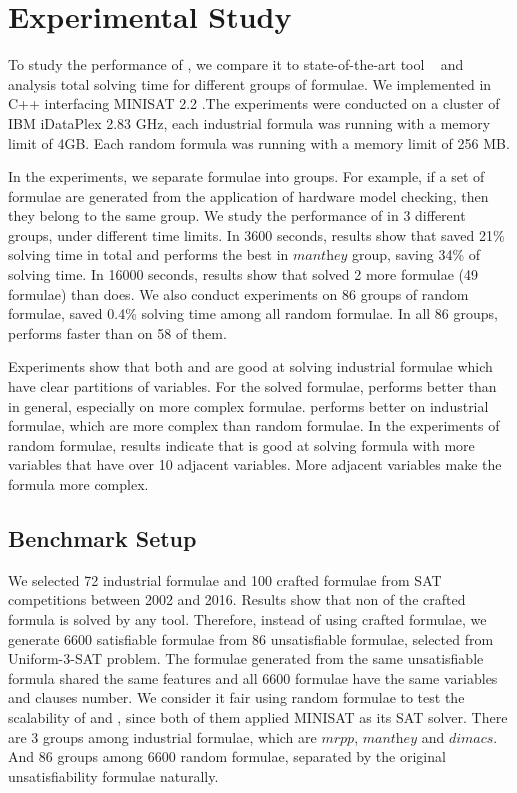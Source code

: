 \section{Experimental Study}\label{sec:expr}
To study the performance of \tool, we compare it to state-of-the-art tool \minibones~\cite{JLM15} and analysis total solving time for different groups of formulae.
We implemented \tool in C++ interfacing MINISAT 2.2 \cite{MINISAT}.The experiments were conducted on a cluster of IBM iDataPlex 2.83 GHz, each industrial formula was running with a memory limit of 4GB. Each random formula was running with a memory limit of 256 MB.

In the experiments, we separate formulae into groups. For example, if a set of formulae are generated from the application of hardware model checking, then they belong to the same group. We study the performance of \tool in 3 different groups, under different time limits. In 3600 seconds, results show that \tool saved 21\% solving time in total and performs the best in $\textit{manthey}$ group, saving 34\% of solving time. In 16000 seconds, results show that \tool solved 2 more formulae (49 formulae) than \minibones does.
We also conduct experiments on 86 groups of random formulae, \tool saved 0.4\% solving time among all random formulae. In all 86 groups, \tool performs faster than \minibones on 58 of them.

Experiments show that both \tool and \minibones are good at solving industrial formulae which have clear partitions of variables. For the solved formulae, \tool performs better than \minibones in general, especially on more complex formulae. \tool performs better on industrial formulae, which are more complex than random formulae. In the experiments of random formulae, results indicate that \tool is good at solving formula with more variables that have over 10 adjacent variables. More adjacent variables make the formula more complex.
\subsection{Benchmark Setup}

We selected 72 industrial formulae and 100 crafted formulae from SAT competitions between 2002 and 2016. Results show that non of the crafted formula is solved by any tool. Therefore, instead of using crafted formulae, we generate 6600 satisfiable formulae from 86 unsatisfiable formulae, selected from Uniform-3-SAT problem. The formulae generated from the same unsatisfiable formula shared the same features and all 6600 formulae have the same variables and clauses number. We consider it fair using random formulae to test the scalability of \tool and \minibones, since both of them applied MINISAT as its SAT solver.
There are 3 groups among industrial formulae, which are $\textit{mrpp}$, $\textit{manthey}$ and $\textit{dimacs}$. And 86 groups among 6600 random formulae, separated by the original unsatisfiability formulae naturally.

